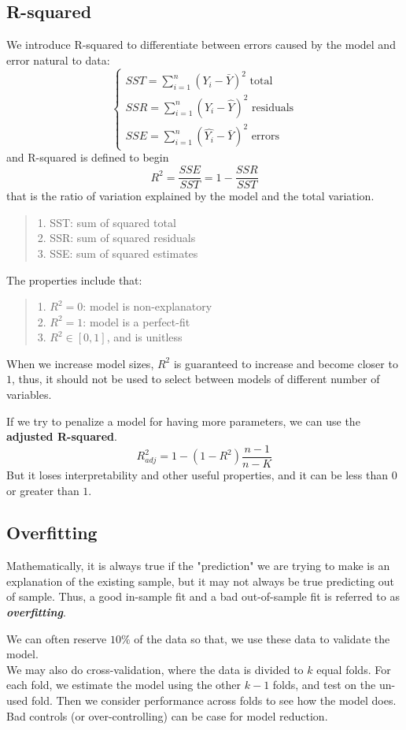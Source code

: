 \subsection{R-squared}
We introduce R-squared to differentiate between errors caused by the model and error natural to data:
$$\begin{cases}
    SST = \sum_{i=1}^{n} (Y_i - \bar{Y})^2 \text{ total} \\
    SSR = \sum_{i=1}^{n} (Y_i - \hat{Y})^2 \text{ residuals} \\
    SSE = \sum_{i=1}^{n} (\hat{Y_i} - \bar{Y})^2 \text{ errors}
\end{cases}$$
and R-squared is defined to begin
$$R^2 = \frac{SSE}{SST} = 1 - \frac{SSR}{SST}$$
that is the ratio of variation explained by the model and the total variation.
\begin{quote}
    1. SST: sum of squared total \\
    2. SSR: sum of squared residuals \\
    3. SSE: sum of squared estimates
\end{quote}

The properties include that:
\begin{quote}
    1. $R^2 = 0$: model is non-explanatory \\
    2. $R^2 = 1$: model is a perfect-fit \\
    3. $R^2 \in [0, 1]$, and is unitless
\end{quote}

When we increase model sizes, $R^2$ is guaranteed to increase and become closer to $1$, thus, it should not be used to select between models of different number of variables.

If we try to penalize a model for having more parameters, we can use the \textbf{adjusted R-squared}.
$$R_{adj}^2 = 1 - (1-R^2)\frac{n-1}{n-K}$$
But it loses interpretability and other useful properties, and it can be less than $0$ or greater than $1$.

\subsection{Overfitting}
Mathematically, it is always true if the "prediction" we are trying to make is an explanation of the existing sample, but it may not always be true predicting out of sample. Thus, a good in-sample fit and a bad out-of-sample fit is referred to as \textbf{\textit{overfitting}}.

We can often reserve $10\%$ of the data so that, we use these data to validate the model. \\
We may also do cross-validation, where the data is divided to $k$ equal folds. For each fold, we estimate the model using the other $k-1$ folds, and test on the un-used fold. Then we consider performance across folds to see how the model does. \\
Bad controls (or over-controlling) can be case for model reduction.

